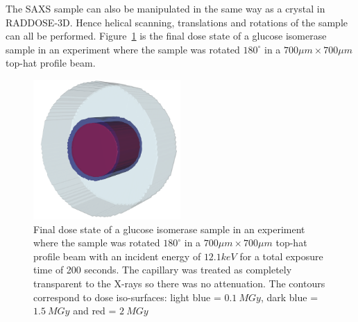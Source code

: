 The SAXS sample can also be manipulated in the same way as a crystal in RADDOSE-3D.
Hence helical scanning, translations and rotations of the sample can all be performed.
Figure~\ref{fig:SAXS cylinder rotated} is the final dose state of a glucose isomerase sample in an experiment where the sample was rotated $180^{\circ}$ in a $ 700 \mu m \times 700 \mu m $ top-hat profile beam.
\begin{figure}
    \centering
    \includegraphics[width=0.5\textwidth]{figures/saxs/SAXScylinder.png}
    \caption{Final dose state of a glucose isomerase sample in an experiment where the sample was rotated $180^{\circ}$ in a $ 700 \mu m \times 700 \mu m $ top-hat profile beam with an incident energy of $ 12.1 keV $ for a total exposure time of 200 seconds. The capillary was treated as completely transparent to the X-rays so there was no attenuation. The contours correspond to dose iso-surfaces: light blue = $ 0.1\ MGy $, dark blue = $ 1.5\ MGy $ and red = $ 2\ MGy $ }
    \label{fig:SAXS cylinder rotated}
\end{figure}
